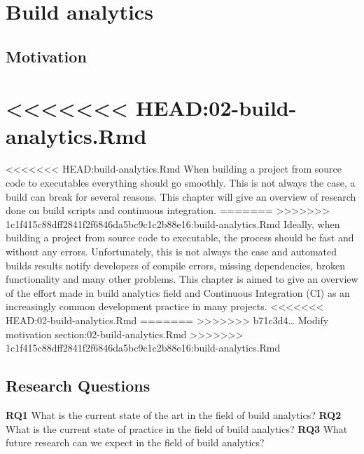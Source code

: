 \documentclass[]{book}
\begin{document}
\chapter{Build analytics}\label{build-analytics}

\section{Motivation}\label{motivation}

\chapter{\textless{}\textless{}\textless{}\textless{}\textless{}\textless{}\textless{}
HEAD:02-build-analytics.Rmd}\label{head02-build-analytics.rmd}

\textless{}\textless{}\textless{}\textless{}\textless{}\textless{}\textless{}
HEAD:build-analytics.Rmd When building a project from source code to
executables everything should go smoothly. This is not always the case,
a build can break for several reasons. This chapter will give an
overview of research done on build scripts and continuous integration.
=======
\textgreater{}\textgreater{}\textgreater{}\textgreater{}\textgreater{}\textgreater{}\textgreater{}
1c1f415c88dff2841f2f6846da5bc9c1c2b88e16:build-analytics.Rmd Ideally,
when building a project from source code to executable, the process
should be fast and without any errors. Unfortunately, this is not always
the case and automated builds results notify developers of compile
errors, missing dependencies, broken functionality and many other
problems. This chapter is aimed to give an overview of the effort made
in build analytics field and Continuous Integration (CI) as an
increasingly common development practice in many projects.
\textless{}\textless{}\textless{}\textless{}\textless{}\textless{}\textless{}
HEAD:02-build-analytics.Rmd =======
\textgreater{}\textgreater{}\textgreater{}\textgreater{}\textgreater{}\textgreater{}\textgreater{}
b71c3d4\ldots{} Modify motivation section:02-build-analytics.Rmd
\textgreater{}\textgreater{}\textgreater{}\textgreater{}\textgreater{}\textgreater{}\textgreater{}
1c1f415c88dff2841f2f6846da5bc9c1c2b88e16:build-analytics.Rmd

\section{Research Questions}\label{research-questions}

\textbf{RQ1} What is the current state of the art in the field of build
analytics? \textbf{RQ2} What is the current state of practice in the
field of build analytics? \textbf{RQ3} What future research can we
expect in the field of build analytics?
\end{document}
